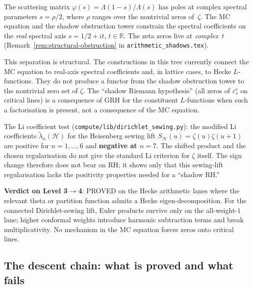 \documentclass[11pt]{article}
\newcommand{\cH}{\mathcal{H}}
\newcommand{\bR}{\mathbb{R}}
\begin{document}
\begin{warning}
\label{warn:no-shadow-rh}
The scattering matrix $\varphi(s) = \Lambda(1{-}s)/\Lambda(s)$ has
poles at complex spectral parameters $s = \rho/2$, where $\rho$
ranges over the nontrivial zeros of~$\zeta$.  The MC equation and
the shadow obstruction tower constrain the spectral coefficients on the
\emph{real} spectral axis $s = 1/2 + it$, $t \in \bR$.  The zeta
zeros live at \emph{complex}~$t$
(Remark~\ref{rem:structural-obstruction} in
\texttt{arithmetic\_shadows.tex}).

This separation is structural.  The constructions in this tree
currently connect the MC equation to real-axis spectral coefficients
and, in lattice cases, to Hecke $L$-functions.  They do not produce
a functor from the shadow obstruction tower to the nontrivial zero
set of $\zeta$.  The ``shadow Riemann hypothesis'' (all zeros of
$\varepsilon^c_s$ on critical lines) is a consequence of GRH for
the constituent $L$-functions when such a factorisation is present,
not a consequence of the MC equation.

The Li coefficient test
(\texttt{compute/lib/dirichlet\_sewing.py}): the modified Li
coefficients $\tilde\lambda_n(\cH)$ for the Heisenberg sewing lift
$S_\cH(u) = \zeta(u)\zeta(u{+}1)$ are positive for
$n = 1, \ldots, 6$ and \textbf{negative at $n = 7$}.  The shifted
product and the chosen regularisation do not give the standard Li
criterion for $\zeta$ itself.  The sign change therefore does not
bear on RH; it shows only that this sewing-lift regularisation lacks
the positivity properties needed for a ``shadow RH.''
\end{warning}

\textbf{Verdict on Level 3$\to$4}: PROVED on the Hecke arithmetic
lanes where the relevant theta or partition function admits a Hecke
eigen-decomposition.  For the connected Dirichlet-sewing lift,
Euler products survive only on the all-weight-$1$ lane; higher
conformal weights introduce harmonic subtraction terms and break
multiplicativity.  No mechanism in the MC equation forces zeros onto
critical lines.

\subsection{The descent chain: what is proved and what fails}
\end{document}
